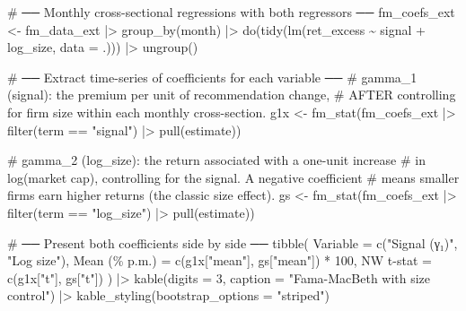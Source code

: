 \documentclass[
  letterpaper,
  DIV=11,
  numbers=noendperiod]{scrartcl}
\newenvironment{Shaded}{\begin{snugshade}}{\end{snugshade}}
\newcommand{\AttributeTok}[1]{\textcolor[rgb]{0.40,0.45,0.13}{#1}}
\newcommand{\CommentTok}[1]{\textcolor[rgb]{0.37,0.37,0.37}{#1}}
\newcommand{\DecValTok}[1]{\textcolor[rgb]{0.68,0.00,0.00}{#1}}
\newcommand{\FunctionTok}[1]{\textcolor[rgb]{0.28,0.35,0.67}{#1}}
\newcommand{\NormalTok}[1]{\textcolor[rgb]{0.00,0.23,0.31}{#1}}
\newcommand{\OtherTok}[1]{\textcolor[rgb]{0.00,0.23,0.31}{#1}}
\newcommand{\SpecialCharTok}[1]{\textcolor[rgb]{0.37,0.37,0.37}{#1}}
\newcommand{\StringTok}[1]{\textcolor[rgb]{0.13,0.47,0.30}{#1}}
\begin{document}
\begin{Shaded}
\begin{Highlighting}[]
\CommentTok{\# ── Monthly cross{-}sectional regressions with both regressors ──}
\NormalTok{fm\_coefs\_ext }\OtherTok{\textless{}{-}}\NormalTok{ fm\_data\_ext }\SpecialCharTok{|\textgreater{}}
  \FunctionTok{group\_by}\NormalTok{(month) }\SpecialCharTok{|\textgreater{}}
  \FunctionTok{do}\NormalTok{(}\FunctionTok{tidy}\NormalTok{(}\FunctionTok{lm}\NormalTok{(ret\_excess }\SpecialCharTok{\textasciitilde{}}\NormalTok{ signal }\SpecialCharTok{+}\NormalTok{ log\_size, }\AttributeTok{data =}\NormalTok{ .))) }\SpecialCharTok{|\textgreater{}}
  \FunctionTok{ungroup}\NormalTok{()}

\CommentTok{\# ── Extract time{-}series of coefficients for each variable ──}
\CommentTok{\# gamma\_1 (signal): the premium per unit of recommendation change,}
\CommentTok{\#   AFTER controlling for firm size within each monthly cross{-}section.}
\NormalTok{g1x }\OtherTok{\textless{}{-}} \FunctionTok{fm\_stat}\NormalTok{(fm\_coefs\_ext }\SpecialCharTok{|\textgreater{}} \FunctionTok{filter}\NormalTok{(term }\SpecialCharTok{==} \StringTok{"signal"}\NormalTok{) }\SpecialCharTok{|\textgreater{}} \FunctionTok{pull}\NormalTok{(estimate))}

\CommentTok{\# gamma\_2 (log\_size): the return associated with a one{-}unit increase}
\CommentTok{\#   in log(market cap), controlling for the signal. A negative coefficient}
\CommentTok{\#   means smaller firms earn higher returns (the classic size effect).}
\NormalTok{gs  }\OtherTok{\textless{}{-}} \FunctionTok{fm\_stat}\NormalTok{(fm\_coefs\_ext }\SpecialCharTok{|\textgreater{}} \FunctionTok{filter}\NormalTok{(term }\SpecialCharTok{==} \StringTok{"log\_size"}\NormalTok{) }\SpecialCharTok{|\textgreater{}} \FunctionTok{pull}\NormalTok{(estimate))}

\CommentTok{\# ── Present both coefficients side by side ──}
\FunctionTok{tibble}\NormalTok{(}
  \AttributeTok{Variable =} \FunctionTok{c}\NormalTok{(}\StringTok{"Signal (γ₁)"}\NormalTok{, }\StringTok{"Log size"}\NormalTok{),}
  \StringTok{\textasciigrave{}}\AttributeTok{Mean (\% p.m.)}\StringTok{\textasciigrave{}} \OtherTok{=} \FunctionTok{c}\NormalTok{(g1x[}\StringTok{"mean"}\NormalTok{], gs[}\StringTok{"mean"}\NormalTok{]) }\SpecialCharTok{*} \DecValTok{100}\NormalTok{,}
  \StringTok{\textasciigrave{}}\AttributeTok{NW t{-}stat}\StringTok{\textasciigrave{}} \OtherTok{=} \FunctionTok{c}\NormalTok{(g1x[}\StringTok{"t"}\NormalTok{], gs[}\StringTok{"t"}\NormalTok{])}
\NormalTok{) }\SpecialCharTok{|\textgreater{}}
  \FunctionTok{kable}\NormalTok{(}\AttributeTok{digits =} \DecValTok{3}\NormalTok{, }\AttributeTok{caption =} \StringTok{"Fama{-}MacBeth with size control"}\NormalTok{) }\SpecialCharTok{|\textgreater{}}
  \FunctionTok{kable\_styling}\NormalTok{(}\AttributeTok{bootstrap\_options =} \StringTok{"striped"}\NormalTok{)}
\end{Highlighting}
\end{Shaded}
\end{document}
